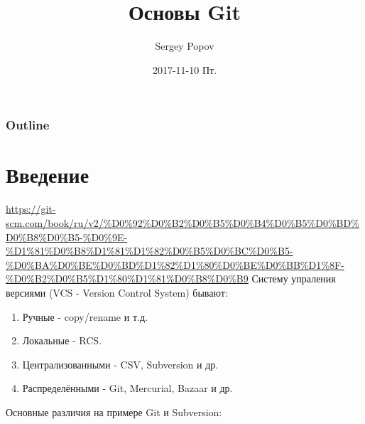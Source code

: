 \documentclass[bigger]{beamer}
\title{Основы Git}
\author{Sergey Popov}
\date{2017-11-10 Пт.}
\begin{document}
\maketitle

\begin{frame}
\frametitle{Outline}
\setcounter{tocdepth}{3}
\tableofcontents
\end{frame}
\section{Введение}
\label{sec-1}

\href{https://git-scm.com/book/ru/v2/%D0%92%D0%B2%D0%B5%D0%B4%D0%B5%D0%BD%D0%B8%D0%B5-%D0%9E-%D1%81%D0%B8%D1%81%D1%82%D0%B5%D0%BC%D0%B5-%D0%BA%D0%BE%D0%BD%D1%82%D1%80%D0%BE%D0%BB%D1%8F-%D0%B2%D0%B5%D1%80%D1%81%D0%B8%D0%B9}{https://git-scm.com/book/ru/v2/\%D0\%92\%D0\%B2\%D0\%B5\%D0\%B4\%D0\%B5\%D0\%BD\%D0\%B8\%D0\%B5-\%D0\%9E-\%D1\%81\%D0\%B8\%D1\%81\%D1\%82\%D0\%B5\%D0\%BC\%D0\%B5-\%D0\%BA\%D0\%BE\%D0\%BD\%D1\%82\%D1\%80\%D0\%BE\%D0\%BB\%D1\%8F-\%D0\%B2\%D0\%B5\%D1\%80\%D1\%81\%D0\%B8\%D0\%B9}
Систему упраления версиями (VCS - Version Control System) бывают:
\begin{enumerate}
\item Ручные - copy/rename и т.д.
\item Локальные - RCS.
\item Централизованными - CSV, Subversion и др.
\item Распределёнными - Git, Mercurial, Bazaar и др.
\end{enumerate}

Основные различия на примере Git и Subversion:
\end{document}
